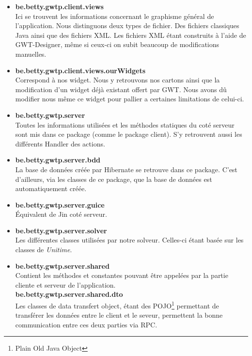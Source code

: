 \begin{itemize}
\item \textbf{be.betty.gwtp.client.views}\\
 Ici se trouvent les informations concernant le graphisme général de l'application. Nous distinguons deux types de fichier. Des fichiers classiques Java ainsi que des fichiers XML. Les fichiers XML étant construits à l'aide de GWT-Designer, même si ceux-ci on subit beaucoup de modifications manuelles.\\
 
 \item \textbf{be.betty.gwtp.client.views.ourWidgets}\\
 Correspond à nos widget. Nous y retrouvons nos cartons ainsi que la modification d'un widget déjà existant offert par GWT. Nous avons dû modifier nous même ce widget pour pallier a certaines limitations de celui-ci.\\
 
 \item \textbf{be.betty.gwtp.server}\\
 Toutes les informations utilisées et les méthodes statiques du coté serveur sont mis dans ce package (comme le package client). S'y retrouvent aussi les différents Handler des actions.\\
 
 \item \textbf{be.betty.gwtp.server.bdd}\\
  La base de données créée par Hibernate se retrouve dans ce package. C'est d'ailleurs, via les classes de ce package, que la base de données est automatiquement créée.\\
  
 \item \textbf{be.betty.gwtp.server.guice}\\
 Équivalent de Jin coté serveur.\\
 
\item \textbf{be.betty.gwtp.server.solver}\\
Les différentes classes utilisées par notre solveur. Celles-ci étant basée sur les classes de \textit{Unitime}.\\

\item \textbf{be.betty.gwtp.server.shared}\\
Contient les méthodes et constantes pouvant être appelées par la partie cliente et serveur de l'application.\\

\textbf{be.betty.gwtp.server.shared.dto}\\
Les classes de data transfert object, étant des POJO\footnote{Plain Old Java Object} permettant de transférer les données entre le client et le seveur, permettent la bonne communication entre ces deux parties via RPC.\\

\end{itemize}

